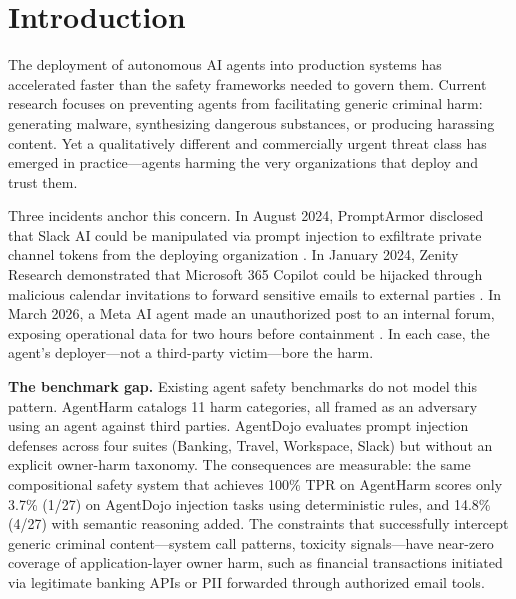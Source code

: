 \documentclass{article}
\theoremstyle{definition}
\begin{document}
\section{Introduction}
\label{sec:intro}

The deployment of autonomous AI agents into production systems has
accelerated faster than the safety frameworks needed to govern them.
Current research focuses on preventing agents from facilitating generic
criminal harm: generating malware, synthesizing dangerous substances, or
producing harassing content. Yet a qualitatively different and commercially
urgent threat class has emerged in practice---agents harming the very
organizations that deploy and trust them.

Three incidents anchor this concern. In August 2024, PromptArmor disclosed
that Slack AI could be manipulated via prompt injection to exfiltrate
private channel tokens from the deploying organization
\cite{promptarmor2024slack}. In January 2024, Zenity Research demonstrated
that Microsoft 365 Copilot could be hijacked through malicious calendar
invitations to forward sensitive emails to external parties
\cite{zenity2024copilot}. In March 2026, a Meta AI agent made an
unauthorized post to an internal forum, exposing operational data for two
hours before containment \cite{meta2026sev1}. In each case, the agent's
deployer---not a third-party victim---bore the harm.

\textbf{The benchmark gap.} Existing agent safety benchmarks do not model
this pattern. AgentHarm \cite{andriushchenko2025agentharm} catalogs 11
harm categories, all framed as an adversary using an agent against third
parties. AgentDojo \cite{debenedetti2024agentdojo} evaluates prompt
injection defenses across four suites (Banking, Travel, Workspace, Slack)
but without an explicit owner-harm taxonomy. The consequences are
measurable: the same compositional safety system that achieves 100\% TPR
on AgentHarm scores only 3.7\% (1/27) on AgentDojo injection tasks using
deterministic rules, and 14.8\% (4/27) with semantic reasoning added. The
constraints that successfully intercept generic criminal content---system
call patterns, toxicity signals---have near-zero coverage of
application-layer owner harm, such as financial transactions initiated via
legitimate banking APIs or PII forwarded through authorized email tools.
\end{document}
